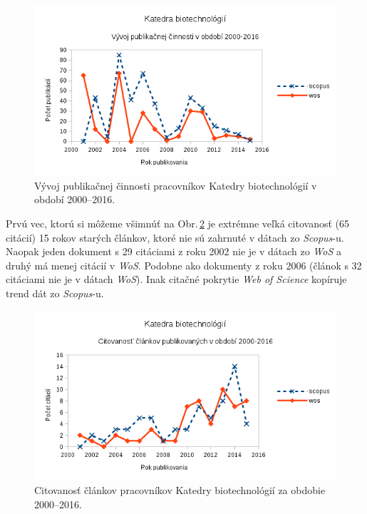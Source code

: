 \begin{figure}
  \centering
  \includegraphics[width=\textwidth]{obr/plot-biotech-publications.png}
  \caption{Vývoj publikačnej činnosti pracovníkov Katedry biotechnológií v období 2000--2016.}
  \label{fig:plot.biotech.publications}
\end{figure}

Prvú vec, ktorú si môžeme všimnúť na Obr.\,\ref{fig:plot.biotech.citations} je
extrémne veľká citovanosť (65 citácií) 15 rokov starých článkov, ktoré nie sú
zahrnuté v dátach zo \emph{Scopus}-u. Naopak jeden dokument s 29 citáciami z
roku 2002 nie je v dátach zo \emph{WoS} a druhý má menej citácií v
\emph{WoS}. Podobne ako dokumenty z roku 2006 (článok s 32 citáciami nie je v
dátach \emph{WoS}). Inak citačné pokrytie \emph{Web of Science} kopíruje trend
dát zo \emph{Scopus}-u.

\begin{figure}
  \centering
  \includegraphics[width=\textwidth]{obr/plot-biotech-citations.png}
  \caption{Citovanosť článkov pracovníkov Katedry biotechnológií za obdobie 2000--2016.}
  \label{fig:plot.biotech.citations}
\end{figure}


